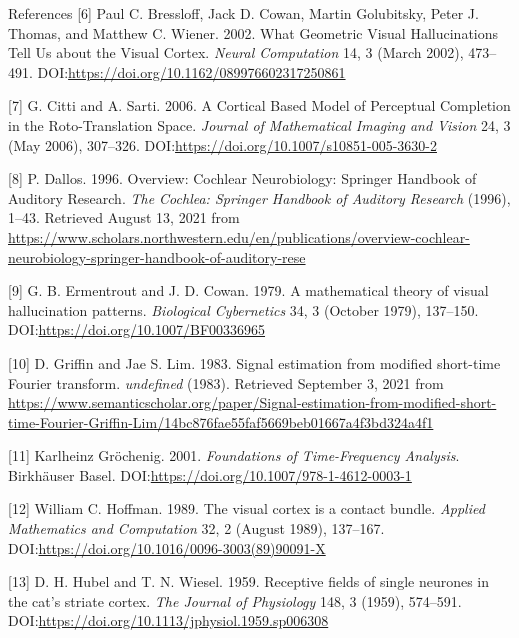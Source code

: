 \documentclass[10pt,american,ignorenonframetext,aspectratio=1610]{beamer}
\theoremstyle{remark}
\begin{document}
\begin{frame}[allowframebreaks]{References}
\leavevmode\hypertarget{ref-bressloff2002a}{}%
{[}6{]} Paul C. Bressloff, Jack D. Cowan, Martin Golubitsky, Peter J.
Thomas, and Matthew C. Wiener. 2002. What Geometric Visual
Hallucinations Tell Us about the Visual Cortex. \emph{Neural
Computation} 14, 3 (March 2002), 473--491.
DOI:\url{https://doi.org/10.1162/089976602317250861}

\leavevmode\hypertarget{ref-citti2006}{}%
{[}7{]} G. Citti and A. Sarti. 2006. A Cortical Based Model of
Perceptual Completion in the Roto-Translation Space. \emph{Journal of
Mathematical Imaging and Vision} 24, 3 (May 2006), 307--326.
DOI:\url{https://doi.org/10.1007/s10851-005-3630-2}

\leavevmode\hypertarget{ref-dallos1996}{}%
{[}8{]} P. Dallos. 1996. Overview: Cochlear Neurobiology: Springer
Handbook of Auditory Research. \emph{The Cochlea: Springer Handbook of
Auditory Research} (1996), 1--43. Retrieved August 13, 2021 from
\url{https://www.scholars.northwestern.edu/en/publications/overview-cochlear-neurobiology-springer-handbook-of-auditory-rese}

\leavevmode\hypertarget{ref-ermentrout1979}{}%
{[}9{]} G. B. Ermentrout and J. D. Cowan. 1979. A mathematical theory of
visual hallucination patterns. \emph{Biological Cybernetics} 34, 3
(October 1979), 137--150. DOI:\url{https://doi.org/10.1007/BF00336965}

\leavevmode\hypertarget{ref-griffin1983}{}%
{[}10{]} D. Griffin and Jae S. Lim. 1983. Signal estimation from
modified short-time Fourier transform. \emph{undefined} (1983).
Retrieved September 3, 2021 from
\url{https://www.semanticscholar.org/paper/Signal-estimation-from-modified-short-time-Fourier-Griffin-Lim/14bc876fae55faf5669beb01667a4f3bd324a4f1}

\leavevmode\hypertarget{ref-grochenig2001}{}%
{[}11{]} Karlheinz Gröchenig. 2001. \emph{Foundations of Time-Frequency
Analysis}. Birkhäuser Basel.
DOI:\url{https://doi.org/10.1007/978-1-4612-0003-1}

\leavevmode\hypertarget{ref-hoffman1989}{}%
{[}12{]} William C. Hoffman. 1989. The visual cortex is a contact
bundle. \emph{Applied Mathematics and Computation} 32, 2 (August 1989),
137--167. DOI:\url{https://doi.org/10.1016/0096-3003(89)90091-X}

\leavevmode\hypertarget{ref-hubel1959}{}%
{[}13{]} D. H. Hubel and T. N. Wiesel. 1959. Receptive fields of single
neurones in the cat's striate cortex. \emph{The Journal of Physiology}
148, 3 (1959), 574--591.
DOI:\url{https://doi.org/10.1113/jphysiol.1959.sp006308}


\end{frame}
\end{document}
